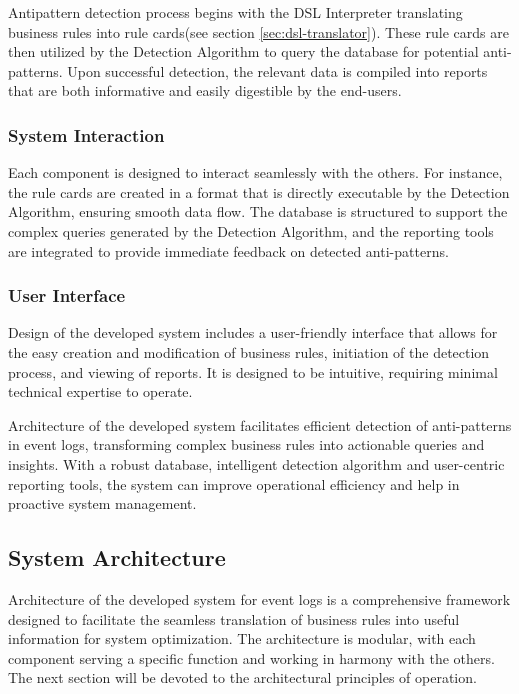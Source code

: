 \documentclass[12pt, times]{article}
\begin{document}
	\hspace{5mm}Antipattern detection process begins with the DSL Interpreter translating business rules into rule cards(see section \ref{sec:dsl-translator}). These rule cards are then utilized by the Detection Algorithm to query the database for potential anti-patterns. Upon successful detection, the relevant data is compiled into reports that are both informative and easily digestible by the end-users.
	
	\subsubsection*{System Interaction}
	
	\hspace{5mm}Each component is designed to interact seamlessly with the others. For instance, the rule cards are created in a format that is directly executable by the Detection Algorithm, ensuring smooth data flow. The database is structured to support the complex queries generated by the Detection Algorithm, and the reporting tools are integrated to provide immediate feedback on detected anti-patterns.
	
	\subsubsection*{User Interface}
	
	\hspace{5mm}Design of the developed system includes a user-friendly interface that allows for the easy creation and modification of business rules, initiation of the detection process, and viewing of reports. It is designed to be intuitive, requiring minimal technical expertise to operate.
	
	\hspace{5mm}Architecture of the developed system facilitates efficient detection of anti-patterns in event logs, transforming complex business rules into actionable queries and insights. With a robust database, intelligent detection algorithm and user-centric reporting tools, the system can improve operational efficiency and help in proactive system management.
	
	\subsection{System Architecture}
	
	\hspace{5mm}Architecture\cite{system_arch} of the developed system for event logs is a comprehensive framework designed to facilitate the seamless translation of business rules into useful information for system optimization. The architecture is modular, with each component serving a specific function and working in harmony with the others. The next section will be devoted to the architectural principles of operation.
	
\end{document}
